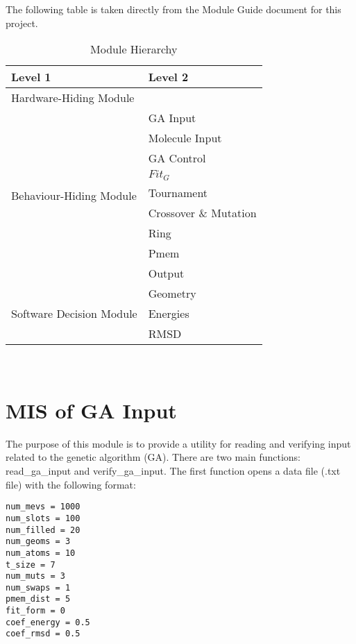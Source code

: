 \documentclass[12pt, titlepage]{article}
\begin{document}
The following table is taken directly from the Module Guide document for this project.

\begin{table}[h!]
	\centering
	\begin{tabular}{p{} p{}}
		\toprule
		\textbf{Level 1} & \textbf{Level 2}\\
		\midrule
		
		{Hardware-Hiding Module} & ~ \\
		\midrule
		
		\multirow{9}{0.3\textwidth}{Behaviour-Hiding Module}& GA Input \\
		& Molecule Input \\
		& GA Control\\
		& $Fit_G$ \\
		& Tournament \\
		& Crossover \& Mutation \\
		& Ring \\
		& Pmem \\
		& Output \\
		
		\midrule
		
		\multirow{3}{0.3\textwidth}{Software Decision Module} & Geometry \\
		& Energies \\
		& RMSD \\
		\bottomrule
		
	\end{tabular}
	\caption{Module Hierarchy}
	\label{TblMH}
\end{table}

\newpage
~\newpage

\section{MIS of GA Input} \label{section-ga_input}

 

The purpose of this module is to provide a utility for reading and verifying 
input related to the genetic algorithm (GA). There are two main functions: 
read\_ga\_input and verify\_ga\_input. The first function opens a data file 
(.txt file) with the following format:

\begin{lstlisting}
num_mevs = 1000
num_slots = 100
num_filled = 20
num_geoms = 3
num_atoms = 10
t_size = 7
num_muts = 3
num_swaps = 1
pmem_dist = 5
fit_form = 0
coef_energy = 0.5
coef_rmsd = 0.5
\end{lstlisting}
\end{document}
